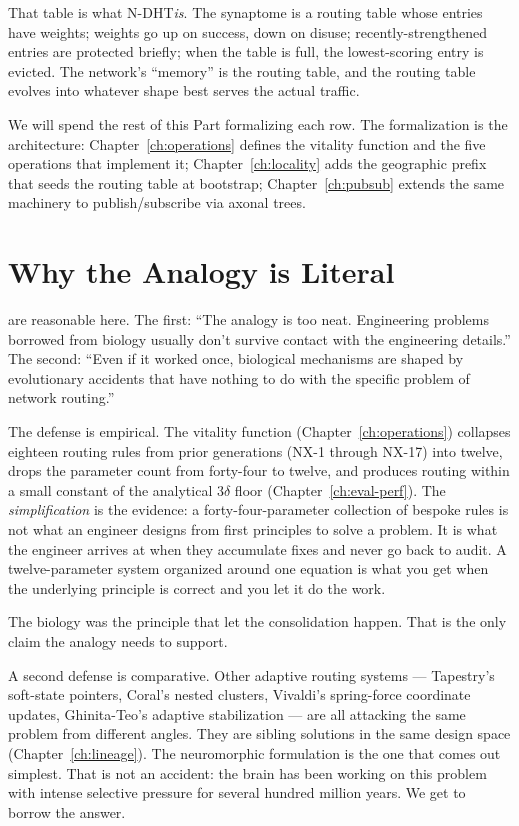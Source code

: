 \documentclass[twoside,nobib]{tufte-book}
\newcommand{\NDHT}{N-DHT\xspace}
\begin{document}
That table is what \NDHT \emph{is}. The synaptome is a routing
table whose entries have weights; weights go up on success, down
on disuse; recently-strengthened entries are protected briefly;
when the table is full, the lowest-scoring entry is evicted. The
network's ``memory'' is the routing table, and the routing table
evolves into whatever shape best serves the actual traffic.

We will spend the rest of this Part formalizing each row. The
formalization is the architecture: Chapter~\ref{ch:operations}
defines the vitality function and the five operations that
implement it; Chapter~\ref{ch:locality} adds the geographic
prefix that seeds the routing table at bootstrap; Chapter~\ref{ch:pubsub}
extends the same machinery to publish/subscribe via axonal trees.

\section{Why the Analogy is Literal}

 are reasonable here. The first: ``The
analogy is too neat. Engineering problems borrowed from biology
usually don't survive contact with the engineering details.'' The
second: ``Even if it worked once, biological mechanisms are
shaped by evolutionary accidents that have nothing to do with the
specific problem of network routing.''

The defense is empirical. The vitality function (Chapter~\ref{ch:operations})
collapses eighteen routing rules from prior generations
(NX-1 through NX-17) into twelve, drops the parameter count from
forty-four to twelve, and produces routing within a small constant
of the analytical $3\delta$ floor (Chapter~\ref{ch:eval-perf}).
The \emph{simplification} is the evidence: a forty-four-parameter
collection of bespoke rules is not what an engineer designs from
first principles to solve a problem. It is what the engineer
arrives at when they accumulate fixes and never go back to
audit. A twelve-parameter system organized around one equation is
what you get when the underlying principle is correct and you
let it do the work.

The biology was the principle that let the consolidation happen.
That is the only claim the analogy needs to support.

A second defense is comparative. Other adaptive routing
systems --- Tapestry's soft-state pointers, Coral's nested
clusters, Vivaldi's spring-force coordinate updates,
Ghinita-Teo's adaptive stabilization --- are all attacking the
same problem from different angles. They are sibling solutions in
the same design space (Chapter~\ref{ch:lineage}). The neuromorphic
formulation is the one that comes out simplest. That is not an
accident: the brain has been working on this problem with intense
selective pressure for several hundred million years. We get to
borrow the answer.
\end{document}
